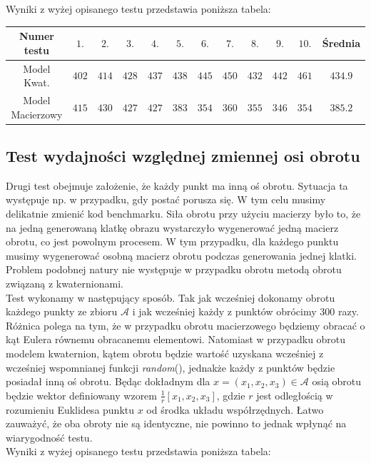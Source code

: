 \documentclass[a4paper,twoside,11pt,reqno]{mwrep}
\theoremstyle{plain} \newtheorem{twr}{Twierdzenie}
\theoremstyle{plain} \newtheorem{lem}{Lemat}
\theoremstyle{definition} \newtheorem{defi}{Definicja}
\theoremstyle{remark} \newtheorem*{wni}{Wniosek}
\theoremstyle{definition} \newtheorem{uwaga}{Uwaga}
\theoremstyle{definition}\newtheorem{prz}{Przykład}
\begin{document}
Wyniki z wyżej opisanego testu przedstawia poniższa tabela:
\begin{table}[h]
\begin{tabular}{|c|c|c|c|c|c|c|c|c|c|c|c|}
\hline
      Numer testu &  $1.$  &  $2.$  &  $3.$  &  $4.$ &  $5.$ &  $6.$ &  $7.$ &  $8.$ &  $9.$ &  $10.$ & Średnia \\ \hline
Model Kwat. &$402$&$414$&$428$&$437$&$438$&$445$&$450$&$432$&$442$&$461$& $434.9$      \\ \hline
Model Macierzowy    &$415$&$430$&$427$&$427$&$383$&$354$&$360$&$355$&$346$&$354$& $385.2$       \\ \hline
\end{tabular}
\end{table}
\subsection*{Test wydajności względnej zmiennej osi obrotu}
Drugi test obejmuje założenie, że każdy punkt ma inną oś obrotu. 
Sytuacja ta występuje np. w przypadku, gdy postać porusza się. 
W tym celu musimy delikatnie zmienić kod benchmarku. Siła obrotu przy użyciu macierzy było to, że na
jedną generowaną klatkę obrazu wystarczyło wygenerować jedną macierz obrotu, co jest powolnym procesem.
W tym przypadku, dla każdego punktu musimy wygenerować osobną macierz obrotu podczas generowania jednej klatki.
Problem podobnej natury nie występuje w przypadku obrotu metodą obrotu związaną z kwaternionami.\\

Test wykonamy w następujący sposób. Tak jak wcześniej dokonamy obrotu każdego punkty ze zbioru $\mathcal{A}$ i jak wcześniej
każdy z punktów obrócimy $300$ razy. Różnica polega na tym, że w przypadku obrotu macierzowego będziemy obracać o kąt Eulera
równemu obracanemu elementowi. Natomiast w przypadku obrotu modelem kwaternion, kątem obrotu będzie wartość uzyskana wcześniej
z wcześniej wspomnianej funkcji \textit{random}(), jednakże każdy z punktów będzie posiadał inną oś obrotu. Będąc dokładnym
dla $x=(x_{1},x_{2},x_{3})\in\mathcal{A}$ osią obrotu będzie wektor definiowany wzorem 
$\frac{1}{r}[x_{1},x_{2},x_{3}]$, gdzie $r$ jest odległością w rozumieniu Euklidesa punktu $x$ od środka układu współrzędnych.
Łatwo zauważyć, że oba obroty nie są identyczne, nie powinno to jednak wpłynąć na wiarygodność testu.\\

Wyniki z wyżej opisanego testu przedstawia poniższa tabela:
\end{document}
